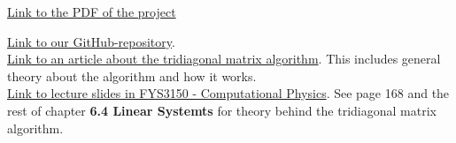 \documentclass{article}
\begin{document}
\href{https://github.com/CompPhysics/ComputationalPhysics/blob/master/doc/Projects/2019/Project1/pdf/Project1.pdf}{Link to the PDF of the project}

\href{https://github.com/Erikbgram/Fys3150}{Link to our GitHub-repository}. \\

\href{http://www.industrial-maths.com/ms6021_thomas.pdf}{Link to an article about the tridiagonal matrix algorithm}. This includes general theory about the algorithm and how it works. \\

\href{https://github.com/CompPhysics/ComputationalPhysics/blob/master/doc/Lectures/lectures2015.pdf}{Link to lecture slides in FYS3150 - Computational Physics}. See page 168 and the rest of chapter \textbf{6.4 Linear Systemts} for theory behind the tridiagonal matrix algorithm.






\end{document}
